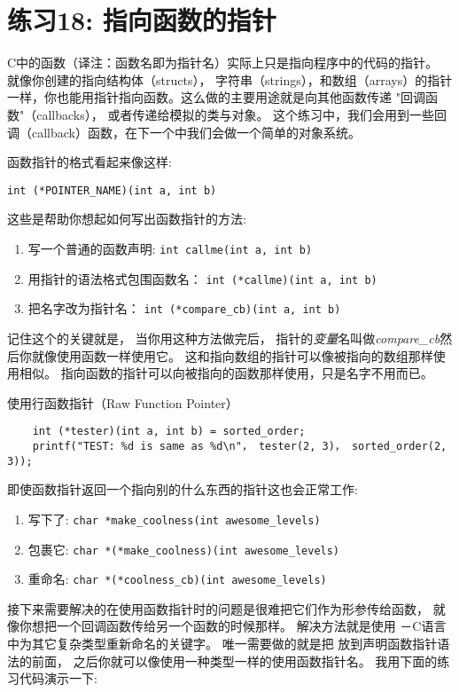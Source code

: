 \chapter{练习18: 指向函数的指针}

C中的函数（译注：函数名即为指针名）实际上只是指向程序中的代码的指针。 就像你创建的指向结构体（structs）， 字符串（strings），和数组（arrays）的指针一样，你也能用指针指向函数。这么做的主要用途就是向其他函数传递
"回调函数"（callbacks）， 或者传递给模拟的类与对象。 这个练习中，我们会用到一些回调（callback）函数，在下一个中我们会做一个简单的对象系统。

函数指针的格式看起来像这样:

\verb|int (*POINTER_NAME)(int a, int b)|

这些是帮助你想起如何写出函数指针的方法:

\begin{enumerate}
\item 写一个普通的函数声明: \verb|int callme(int a, int b)|
\item 用指针的语法格式包围函数名： \verb|int (*callme)(int a, int b)|
\item 把名字改为指针名： \verb|int (*compare_cb)(int a, int b)|
\end{enumerate}

记住这个的关键就是， 当你用这种方法做完后， 指针的\emph{变量}名叫做\emph{compare\_cb}然后你就像使用函数一样使用它。  这和指向数组的指针可以像被指向的数组那样使用相似。 指向函数的指针可以向被指向的函数那样使用，只是名字不用而已。

\begin{code}{使用行函数指针（Raw Function Pointer）}
\begin{lstlisting}
    int (*tester)(int a, int b) = sorted_order;
    printf("TEST: %d is same as %d\n"， tester(2, 3)， sorted_order(2, 3)); 
\end{lstlisting}
\end{code}

即使函数指针返回一个指向别的什么东西的指针这也会正常工作:

\begin{enumerate}
\item 写下了: \verb|char *make_coolness(int awesome_levels)|
\item 包裹它: \verb|char *(*make_coolness)(int awesome_levels)|
\item 重命名: \verb|char *(*coolness_cb)(int awesome_levels)|
\end{enumerate}

接下来需要解决的在使用函数指针时的问题是很难把它们作为形参传给函数， 就像你想把一个回调函数传给另一个函数的时候那样。 解决方法就是使用 －C语言中为其它复杂类型重新命名的关键字。
唯一需要做的就是把  放到声明函数指针语法的前面， 之后你就可以像使用一种类型一样的使用函数指针名。 我用下面的练习代码演示一下:

